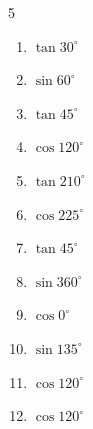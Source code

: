 \begin{multicols}{5}
\begin{enumerate}

  \item $\displaystyle \tan{30^\circ}$


  \item $\displaystyle \sin{60^\circ}$


  \item $\displaystyle \tan{45^\circ}$

        \phantom{$\displaystyle =1$}

  \item $\displaystyle \cos{120^\circ}$


  \item $\displaystyle \tan{210^\circ}$


  \item $\displaystyle \cos{225^\circ}$


  \item $\displaystyle \tan{45^\circ}$

        \phantom{$\displaystyle =1$}

\columnbreak %

  \item $\displaystyle \sin{360^\circ}$

        \phantom{$\displaystyle =0$}

  \item $\displaystyle \cos{0^\circ}$

        \phantom{$\displaystyle =1$}

  \item $\displaystyle \sin{135^\circ}$


  \item $\displaystyle \cos{120^\circ}$


  \item $\displaystyle \cos{120^\circ}$



\end{enumerate}
\end{multicols}
